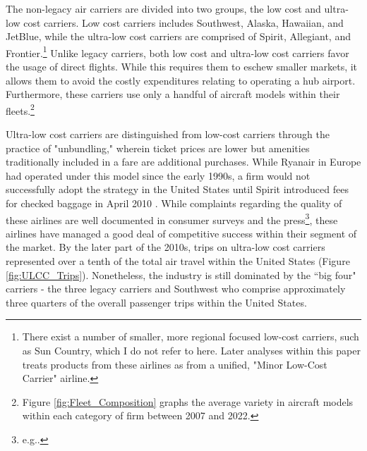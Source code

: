 \documentclass{article}
\begin{document}
	The non-legacy air carriers are divided into two groups, the low cost and ultra-low cost carriers. Low cost carriers includes Southwest, Alaska,  Hawaiian, and JetBlue, while the ultra-low cost carriers are comprised of Spirit, Allegiant, and Frontier.\footnote{There exist a number of smaller, more regional focused low-cost carriers, such as Sun Country, which I do not refer to here. Later analyses within this paper treats products from these airlines as from a unified, "Minor Low-Cost Carrier" airline.} Unlike legacy carriers, both low cost and ultra-low cost carriers favor the usage of direct flights. While this requires them to eschew smaller markets, it allows them to avoid the costly expenditures relating to operating a hub airport. Furthermore, these carriers use only a handful of aircraft models within their fleets.\footnote{Figure \ref{fig:Fleet_Composition} graphs the average variety in aircraft models within each category of firm between 2007 and 2022.}

	Ultra-low cost carriers are distinguished from low-cost carriers through the practice of "unbundling," wherein ticket prices are lower but amenities traditionally included in a fare are additional purchases. While Ryanair in Europe had operated under this model since the early 1990s, a firm would not successfully adopt the strategy in the United States until Spirit introduced fees for checked baggage in April 2010 \citep{bachwich_emergence_2017}. While complaints regarding the quality of these airlines are well documented in consumer surveys and the press\footnote{e.g.\citet{vasel_spirit_2016, elliott_jetblue_2022}.}, these airlines have managed a good deal of competitive success within their segment of the market. By the later part of the 2010s, trips on ultra-low cost carriers represented over a tenth of the total air travel within the United States (Figure \ref{fig:ULCC_Trips}).  Nonetheless, the industry is still dominated by the ``big four" carriers - the three legacy carriers and Southwest who comprise approximately three quarters of the overall passenger trips within the United States. 
\end{document}
